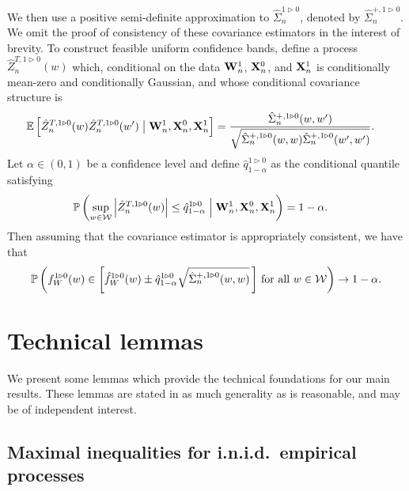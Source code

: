 %
We then use a positive semi-definite approximation to
$\hat\Sigma_n^{1 \triangleright 0}$, denoted by
$\hat\Sigma_n^{+, 1 \triangleright 0}$.
We omit the proof of consistency of these covariance estimators
in the interest of brevity.
To construct feasible uniform confidence bands,
define a process $\hat Z_n^{T, 1 \triangleright 0}(w)$ which,
conditional on the data $\mathbf{W}_n^1$, $\mathbf{X}_n^0$, and $\mathbf{X}_n^1$
is conditionally mean-zero and conditionally Gaussian, and whose
conditional covariance structure is
%
\begin{align*}
  \mathbb{E}\left[
    \hat Z_n^{T, 1 \triangleright 0}(w)
    \hat Z_n^{T, 1 \triangleright 0}(w')
  \bigm| \mathbf{W}_n^1, \mathbf{X}_n^0, \mathbf{X}_n^1 \right]
  &=
  \frac{\hat \Sigma_n^{+, 1 \triangleright 0}(w,w')}
  {\sqrt{\hat \Sigma_n^{+, 1 \triangleright 0}(w,w)
  \hat \Sigma_n^{+, 1 \triangleright 0}(w',w')}}.
\end{align*}
%
Let $\alpha \in (0,1)$ be a confidence level and define
$\hat q_{1-\alpha}^{1 \triangleright 0}$
as the conditional quantile satisfying
%
\begin{align*}
  \mathbb{P}\left(
    \sup_{w \in \mathcal{W}}
    \left| \hat Z_n^{T, 1 \triangleright 0}(w) \right|
    \leq \hat q_{1-\alpha}^{1 \triangleright 0}
    \Bigm\vert \mathbf{W}_n^1, \mathbf{X}_n^0, \mathbf{X}_n^1
  \right)
  &=
  1 - \alpha.
\end{align*}
%
Then assuming that the covariance estimator is appropriately consistent,
we have that
%
\begin{align*}
  \mathbb{P}\left(
    f_W^{1 \triangleright 0}(w)
    \in
    \left[
      \hat f_W^{1 \triangleright 0}(w)
      \pm
      \hat q^{1 \triangleright 0}_{1-\alpha}
      \sqrt{\hat\Sigma_n^{+, 1 \triangleright 0}(w,w)}
    \,\right]
    \,\textup{for all }
    w \in \mathcal{W}
  \right)
  \to 1 - \alpha.
\end{align*}

\section{Technical lemmas}
\label{sec:kernel_app_technical}

We present some lemmas which provide the technical foundations for our main
results. These lemmas are stated in as much generality as is reasonable,
and may be of independent interest.

\subsection{Maximal inequalities for i.n.i.d.\ empirical processes}

